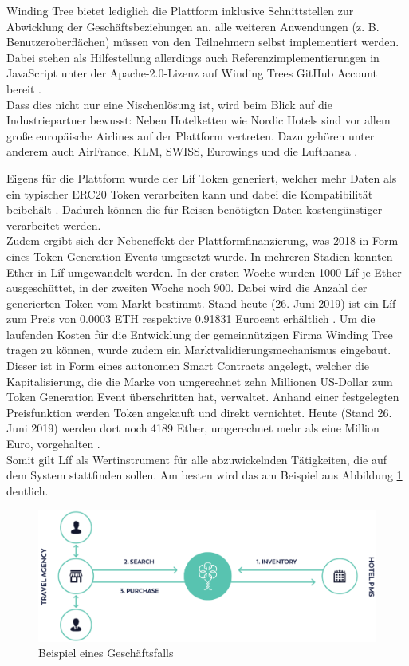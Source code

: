 Winding Tree bietet lediglich die Plattform inklusive Schnittstellen zur Abwicklung der Geschäftsbeziehungen an, alle weiteren Anwendungen (z. B. Benutzeroberflächen) müssen von den Teilnehmern selbst implementiert werden. Dabei stehen als Hilfestellung allerdings auch Referenzimplementierungen in JavaScript unter der Apache-2.0-Lizenz auf Winding Trees GitHub Account bereit \cite{WTGitHub2019}.\\
Dass dies nicht nur eine Nischenlösung ist, wird beim Blick auf die Industriepartner bewusst: Neben Hotelketten wie Nordic Hotels sind vor allem große europäische Airlines auf der Plattform vertreten. Dazu gehören unter anderem auch AirFrance, KLM, SWISS, Eurowings und die Lufthansa \cite{WTWebsite2019}.

Eigens für die Plattform wurde der Líf Token generiert, welcher mehr Daten als ein typischer ERC20 Token verarbeiten kann und dabei die Kompatibilität beibehält \cite[][S. 9]{WT2019}. Dadurch können die für Reisen benötigten Daten kostengünstiger verarbeitet werden.\\ 
Zudem ergibt sich der Nebeneffekt der Plattformfinanzierung, was 2018 in Form eines Token Generation Events umgesetzt wurde. In mehreren Stadien konnten Ether in Líf umgewandelt werden. In der ersten Woche wurden 1000 Líf je Ether ausgeschüttet, in der zweiten Woche noch 900. Dabei wird die Anzahl der generierten Token vom Markt bestimmt. Stand heute (26. Juni 2019) ist ein Líf zum Preis von 0.0003 ETH respektive 0.91831 Eurocent erhältlich \cite{Coinmarketcap2019}. Um die laufenden Kosten für die Entwicklung der gemeinnützigen Firma Winding Tree tragen zu können, wurde zudem ein Marktvalidierungsmechanismus eingebaut. Dieser ist in Form eines autonomen Smart Contracts angelegt, welcher die Kapitalisierung, die die Marke von umgerechnet zehn Millionen US-Dollar zum Token Generation Event überschritten hat, verwaltet. Anhand einer festgelegten Preisfunktion werden Token angekauft und direkt vernichtet. Heute (Stand 26. Juni 2019) werden dort noch 4189 Ether, umgerechnet mehr als eine Million Euro, vorgehalten \cite{Lif2019}.\\
Somit gilt Líf als Wertinstrument für alle abzuwickelnden Tätigkeiten, die auf dem System stattfinden sollen. Am besten wird das am Beispiel aus Abbildung \ref{fig:windingTreeExample} deutlich. \cite[vgl.][S. 12 ff.]{WT2019}\\

\begin{figure}[h!]
  \centering
  \includegraphics[width=\textwidth]{Bilder/WindingTreeExample.png}
  \caption[Beispiel eines Geschäftsfalls]{Beispiel eines Geschäftsfalls \cite[S. 10]{WT2019}}
  \label{fig:windingTreeExample}
\end{figure}

